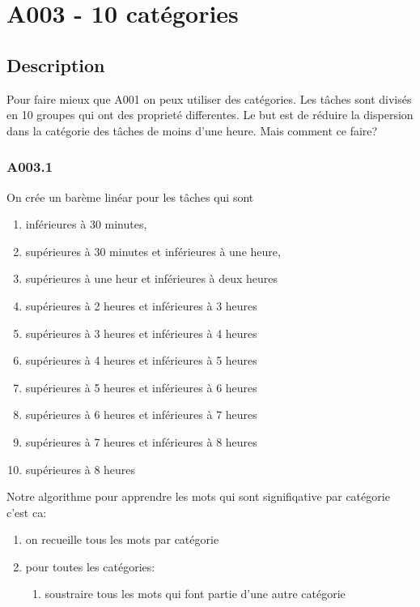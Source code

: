 \newpage{}

\hypertarget{a003---10-categories}{%
\section{A003 - 10 catégories}\label{a003---10-categories}}

\hypertarget{description}{%
\subsection{Description}}

Pour faire mieux que A001 on peux utiliser des catégories. 
Les tâches sont divisés en 10 groupes qui ont des proprieté differentes.
Le but est de réduire la dispersion dans la catégorie des tâches de moins d'une heure.
Mais comment ce faire?

\subsubsection{A003.1}

On crée un barème linéar pour les tâches qui sont 
\begin{enumerate}
\tightlist
\item inférieures à 30 minutes,
\item supérieures à 30 minutes et inférieures à une heure,
\item supérieures à une heur et inférieures à deux heures
\item supérieures à 2 heures et inférieures à 3 heures
\item supérieures à 3 heures et inférieures à 4 heures
\item supérieures à 4 heures et inférieures à 5 heures
\item supérieures à 5 heures et inférieures à 6 heures
\item supérieures à 6 heures et inférieures à 7 heures
\item supérieures à 7 heures et inférieures à 8 heures
\item supérieures à 8 heures
\end{enumerate}

Notre algorithme pour apprendre les mots qui sont signifiqative par catégorie c'est ca:
\begin{enumerate}
\tightlist
\item on recueille tous les mots par catégorie
\item pour toutes les catégories:
    \begin{enumerate}
        \tightlist
        \item soustraire tous les mots qui font partie d'une autre catégorie
    \end{enumerate}
\end{enumerate}





